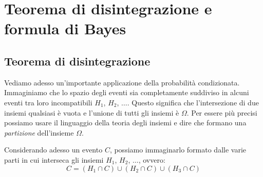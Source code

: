\section{Teorema di disintegrazione e formula di Bayes}
\label{sec:05_bayes}
\subsection{Teorema di disintegrazione}
Vediamo adesso un'importante applicazione della probabilità condizionata. 
Immaginiamo che lo spazio degli eventi sia completamente suddiviso in alcuni 
eventi tra loro incompatibili $H_1$, $H_2$, $\dots$. Questo significa che 
l'intersezione di due insiemi qualsiasi è vuota e l'unione di tutti gli 
insiemi 
è $\Omega$. Per essere più precisi possiamo usare il linguaggio della teoria 
degli insiemi e dire che formano una \emph{partizione} dell'insieme $\Omega$. 

Considerando adesso un evento $C$, possiamo immaginarlo formato dalle varie 
parti in cui interseca gli insiemi $H_1$, $H_2$, $\dots$, ovvero:
$$ C = (H_1 \cap C) \cup (H_2 \cap C) \cup (H_3 \cap C)$$
\begin{inaccessibleblock}
 \begin{figure}[htpb]
\begin{minipage}[c]{.45\textwidth}
\end{minipage}\hfil
\begin{minipage}[c]{.45\textwidth}
\end{minipage}
\end{figure}
\end{inaccessibleblock}

